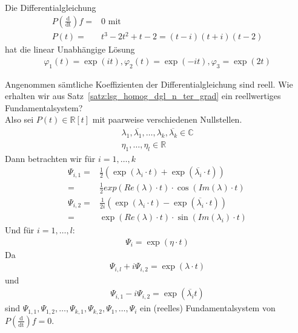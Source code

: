 \begin{Beispiel}{
	Die Differentialgleichung 
	\begin{align*}
		P\left( \frac{\mathrm{d}}{\mathrm{dt}}\right) f = & 0  \text{ mit} \\
		P(t) =  & t^3 -2t^2 + t -2 = (t -i) (t+i)(t-2)
 	\end{align*}
 	hat die linear Unabhängige Lösung
 	\begin{align*}
 		\varphi_1(t) = \exp(it), \varphi_2(t) = \exp(-it), \varphi_3 = \exp(2t)
 	\end{align*}
}\end{Beispiel}

Angenommen sämtliche Koeffizienten der Differentialgleichung sind reell. Wie erhalten wir 
aus Satz~\ref{satz:lsg_homog_dgl_n_ter_grad} ein reellwertiges Fundamentalsystem? \\
Also sei $P(t) \in \mathbb{R}[t]$ mit paarweise verschiedenen Nullstellen.
\begin{align*}
	\lambda_1, \overline{\lambda_1}, \hdots, \lambda_k, \overline{\lambda_k} \in 
		\mathbb{C} \\
	\eta_1, \hdots, \eta_l \in \mathbb{R}
\end{align*}
Dann betrachten wir für $i = 1, \hdots,k$ 
\begin{align*}
	\Psi_{i,1} = & \frac{1}{2} \left( \exp(\lambda_i \cdot t) + 
			\exp(\overline{\lambda_i}\cdot t)\right) \\
		= &\frac{1}{2} exp(Re(\lambda) \cdot t)\cdot \cos(Im(\lambda) \cdot t) \\	
	\Psi_{i,2} = & \frac{1}{2i} \left( \exp(\lambda_i \cdot t) - 
			\exp(\overline{\lambda_i} \cdot t)\right) \\
		= & \exp(Re(\lambda)\cdot t) \cdot \sin(Im(\lambda_i) \cdot t)	
\end{align*}
Und für $i = 1, \hdots, l$: 
\begin{align*}
	\Psi_i = \exp(\eta \cdot t)
\end{align*}
Da 
\begin{align*}
	\Psi_{i,l} + i \Psi_{i,2} = \exp(\lambda \cdot t)
\end{align*}
und
\begin{align*}
	\Psi_{i,1} - i \Psi_{i,2} = \exp(\overline{\lambda_i} t) 
\end{align*}
sind $\Psi_{1,1},\Psi_{1,2}, \hdots, \Psi_{k,1},\Psi_{k,2}, \Psi_{1},\hdots, \Psi_i$
ein (reelles) Fundamentalsystem von $P\left(\frac{\mathrm{d}}{\mathrm{dt}}\right) f = 0$.

